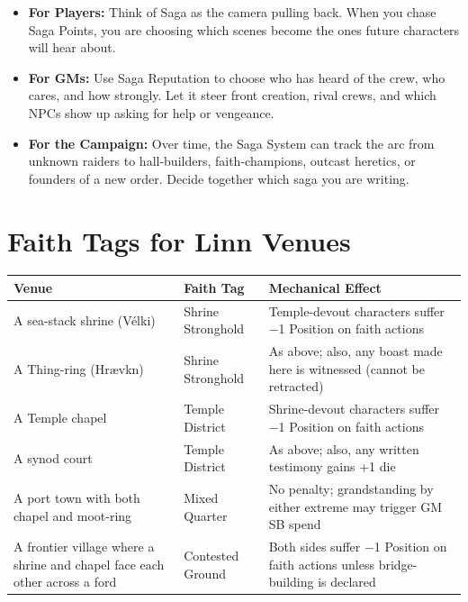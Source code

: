 \documentclass[11pt]{article}
\begin{document}
\begin{itemize}
  \item \textbf{For Players:} Think of Saga as the camera pulling back. When you chase Saga
        Points, you are choosing which scenes become the ones future characters will hear about.
  \item \textbf{For GMs:} Use Saga Reputation to choose who has heard of the crew, who cares, and
        how strongly. Let it steer front creation, rival crews, and which NPCs show up asking for
        help or vengeance.
  \item \textbf{For the Campaign:} Over time, the Saga System can track the arc from unknown
        raiders to hall-builders, faith-champions, outcast heretics, or founders of a new order.
        Decide together which saga you are writing.
\end{itemize}

\appendix
\section{Faith Tags for Linn Venues}

\begin{table}[htbp]
\centering
\begin{tabularx}{\linewidth}{|l|X|X|}
\hline
\textbf{Venue} & \textbf{Faith Tag} & \textbf{Mechanical Effect} \\
\hline
A sea-stack shrine (Vélki) & Shrine Stronghold & Temple-devout characters suffer −1 Position on faith actions \\
\hline
A Thing-ring (Hrævkn) & Shrine Stronghold & As above; also, any boast made here is witnessed (cannot be retracted) \\
\hline
A Temple chapel & Temple District & Shrine-devout characters suffer −1 Position on faith actions \\
\hline
A synod court & Temple District & As above; also, any written testimony gains +1 die \\
\hline
A port town with both chapel and moot-ring & Mixed Quarter & No penalty; grandstanding by either extreme may trigger GM SB spend \\
\hline
A frontier village where a shrine and chapel face each other across a ford & Contested Ground & Both sides suffer −1 Position on faith actions unless bridge-building is declared \\
\hline
\end{tabularx}
\end{table}
\end{document}

